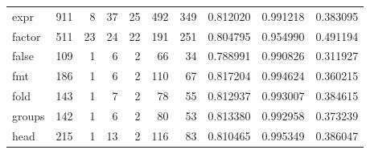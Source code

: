 \begin{tabular}{lrrrrrrrrr}
expr      &                    911 &                                  8 &                                37 &                               25 &                               492 &                             349 &                                0.812020 &                               0.991218 &                             0.383095 \\
factor    &                    511 &                                 23 &                                24 &                               22 &                               191 &                             251 &                                0.804795 &                               0.954990 &                             0.491194 \\
false     &                    109 &                                  1 &                                 6 &                                2 &                                66 &                              34 &                                0.788991 &                               0.990826 &                             0.311927 \\
fmt       &                    186 &                                  1 &                                 6 &                                2 &                               110 &                              67 &                                0.817204 &                               0.994624 &                             0.360215 \\
fold      &                    143 &                                  1 &                                 7 &                                2 &                                78 &                              55 &                                0.812937 &                               0.993007 &                             0.384615 \\
groups    &                    142 &                                  1 &                                 6 &                                2 &                                80 &                              53 &                                0.813380 &                               0.992958 &                             0.373239 \\
head      &                    215 &                                  1 &                                13 &                                2 &                               116 &                              83 &                                0.810465 &                               0.995349 &                             0.386047 \\

\end{tabular}
